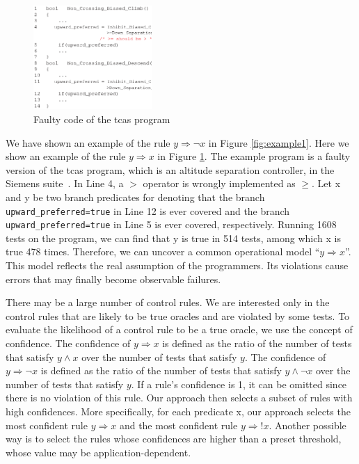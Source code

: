 \documentclass{sig-alternate}
\newcommand{\CodeIn}[1]{{\small\texttt{#1}}}
\begin{document}
\begin{figure}[h]
\begin{center}
  \includegraphics[angle=0,width=0.4\textwidth]{figs/example21.eps}
  \centering
  \caption{Faulty code of the tcas program}
  \label{fig:example2}
\end{center} \vspace{-0.2in}
\end{figure}


We have shown an example of the rule $y\Rightarrow \neg x$ in Figure
\ref{fig:example1}. Here we show an example of the rule
$y\Rightarrow x$ in Figure \ref{fig:example2}. The example program
is a faulty version of the tcas program, which is an altitude
separation controller, in the Siemens suite~\cite{Hutchins94}. In
Line 4, a $>$ operator is wrongly implemented as $\ge$. Let x and y
be two branch predicates for denoting that the branch
\CodeIn{upward\_preferred=true} in Line 12 is ever covered and the
branch \CodeIn{upward\_preferred=true} in Line 5 is ever covered,
respectively. Running 1608 tests on the program, we can find that y
is true in 514 tests, among which x is true 478 times. Therefore, we
can uncover a common operational model ``$y\Rightarrow x$''. This
model reflects the real assumption of the programmers. Its
violations cause errors that may finally become observable failures.



There may be a large number of control rules. We are interested only
in the control rules that are likely to be true oracles and are
violated by some tests. To evaluate the likelihood of a control rule
to be a true oracle, we use the concept of confidence. The
confidence of $y\Rightarrow x$ is defined as the ratio of the number
of tests that satisfy $y\wedge x$ over the number of tests that
satisfy $y$. The confidence of $y\Rightarrow \neg x$ is defined as
the ratio of the number of tests that satisfy $y\wedge \neg x$ over
the number of tests that satisfy $y$. If a rule's confidence is 1,
it can be omitted since there is no violation of this rule. Our
approach then selects a subset of rules with high confidences. More
specifically, for each predicate x, our approach selects the most
confident rule $y\Rightarrow x$ and the most confident rule
$y\Rightarrow !x$. Another possible way is to select the rules whose
confidences are higher than a preset threshold, whose value may be
application-dependent.
\end{document}
